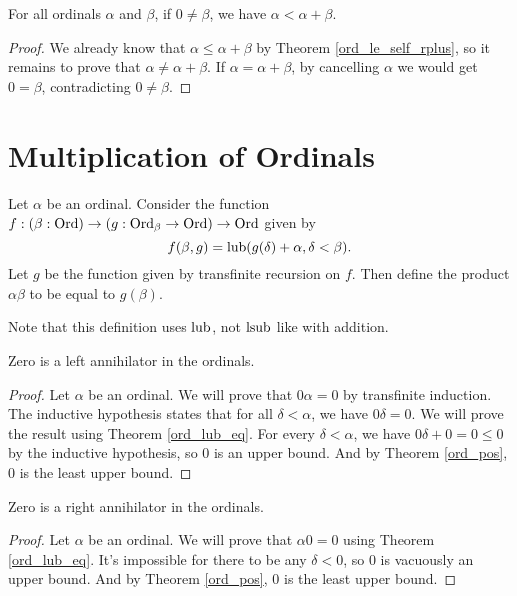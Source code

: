 \documentclass[../../math.tex]{subfiles}
\begin{document}
\begin{theorem} \label{ord_lt_self_rplus}
    For all ordinals $\alpha$ and $\beta$, if $0 \neq \beta$, we have $\alpha <
    \alpha + \beta$.
\end{theorem}
\begin{proof}
    We already know that $\alpha \leq \alpha + \beta$ by Theorem
    \ref{ord_le_self_rplus}, so it remains to prove that $\alpha \neq \alpha +
    \beta$.  If $\alpha = \alpha + \beta$, by cancelling $\alpha$ we would get
    $0 = \beta$, contradicting $0 \neq \beta$.
\end{proof}

\section{Multiplication of Ordinals}

\begin{instance}
    Let $\alpha$ be an ordinal.  Consider the function $f : (\beta : \operatorname{Ord}) \to
    (g : \operatorname{Ord}_\beta \to \operatorname{Ord}) \to \operatorname{Ord}$ given by
    \[
        f(\beta, g) = \operatorname{lub}(g(\delta) + \alpha, \delta < \beta).
    \]
    Let $g$ be the function given by transfinite recursion on $f$.  Then define
    the product $\alpha \beta$ to be equal to $g(\beta)$.
\end{instance}

Note that this definition uses $\operatorname{lub}$, not $\operatorname{lsub}$ like with addition.

\begin{instance}
    Zero is a left annihilator in the ordinals.
\end{instance}
\begin{proof}
    Let $\alpha$ be an ordinal.  We will prove that $0\alpha = 0$ by transfinite
    induction.  The inductive hypothesis states that for all $\delta < \alpha$,
    we have $0\delta = 0$.  We will prove the result using Theorem
    \ref{ord_lub_eq}.  For every $\delta < \alpha$, we have $0\delta + 0 = 0
    \leq 0$ by the inductive hypothesis, so $0$ is an upper bound.  And by
    Theorem \ref{ord_pos}, $0$ is the least upper bound.
\end{proof}

\begin{instance}
    Zero is a right annihilator in the ordinals.
\end{instance}
\begin{proof}
    Let $\alpha$ be an ordinal.  We will prove that $\alpha 0 = 0$ using Theorem
    \ref{ord_lub_eq}.  It's impossible for there to be any $\delta < 0$, so $0$
    is vacuously an upper bound. And by Theorem \ref{ord_pos}, $0$ is the least
    upper bound.
\end{proof}
\end{document}
